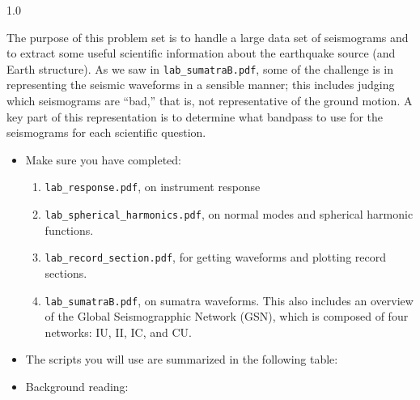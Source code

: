 \documentclass[11pt,titlepage,fleqn]{article}
\begin{document}
\begin{spacing}{1.0}

The purpose of this problem set is to handle a large data set of seismograms and to extract some useful scientific information about the earthquake source (and Earth structure). As we saw in \verb+lab_sumatraB.pdf+, some of the challenge is in representing the seismic waveforms in a sensible manner; this includes judging which seismograms are ``bad,'' that is, not representative of the ground motion. A key part of this representation is to determine what bandpass to use for the seismograms for each scientific question.

\begin{itemize}


\item Make sure you have completed:
%
\begin{enumerate}
\item \verb+lab_response.pdf+, on instrument response

\item \verb+lab_spherical_harmonics.pdf+, on normal modes and spherical harmonic functions.

\item \verb+lab_record_section.pdf+, for getting waveforms and plotting record sections.

\item \verb+lab_sumatraB.pdf+, on sumatra waveforms. This also includes an overview of the Global Seismograpphic Network (GSN), which is composed of four networks: IU, II, IC, and CU.
\end{enumerate}


\item The scripts you will use are summarized in the following table:

\hspace{-2.5cm}



\item Background reading:


\end{itemize}
\end{spacing}
\end{document}
